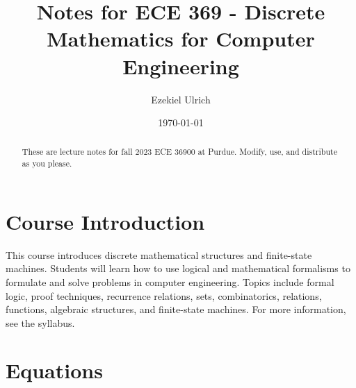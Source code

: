 \documentclass[nobib]{tufte-handout}
\title{Notes for ECE 369 - Discrete Mathematics for Computer Engineering}
\author[Ezekiel Ulrich]{Ezekiel Ulrich}
\date{\today}  %
\begin{document}
\maketitle

\begin{abstract}
These are lecture notes for fall 2023 ECE 36900 at Purdue. Modify, use, and distribute as you please.
\end{abstract}

\tableofcontents

\section{Course Introduction}

This course introduces discrete mathematical structures and 
finite-state machines. Students will learn how to use logical 
and mathematical formalisms to formulate and solve problems in 
computer engineering. Topics include formal logic, proof techniques, 
recurrence relations, sets, combinatorics, relations, functions, 
algebraic structures, and finite-state machines. For more information,
see the syllabus. 

\pagebreak 

\section{Equations}
\end{document}
